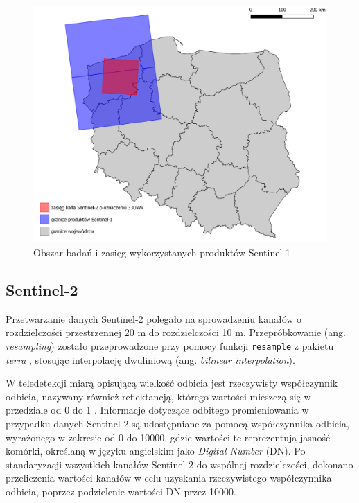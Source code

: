 \documentclass{amuthesis}
\begin{document}
\begin{figure}[t]

{\centering \includegraphics[width=1\textwidth,height=\textheight]{figures/sen1_extents.png}

}

\caption{\label{fig-rycina-s1-extents}Obszar badań i zasięg
wykorzystanych produktów Sentinel-1}

\end{figure}

\hypertarget{sec-processing-s2}{%
\subsection{Sentinel-2}\label{sec-processing-s2}}

Przetwarzanie danych Sentinel-2 polegało na sprowadzeniu kanałów o
rozdzielczości przestrzennej 20 m do rozdzielczości 10 m.
Przepróbkowanie (ang. \emph{resampling}) zostało przeprowadzone przy
pomocy funkcji \texttt{resample} z pakietu \emph{terra}
\autocite{R-terra}, stosując interpolację dwuliniową (ang.
\emph{bilinear interpolation}).

W teledetekcji miarą opisującą wielkość odbicia jest rzeczywisty
współczynnik odbicia, nazywany również reflektancją, którego wartości
mieszczą się w przedziale od 0 do 1 \autocite{hejmanowska_2020_dane}.
Informacje dotyczące odbitego promieniowania w przypadku danych
Sentinel-2 są udostępniane za pomocą współczynnika odbicia, wyrażonego w
zakresie od 0 do 10000, gdzie wartości te reprezentują jasność komórki,
określaną w języku angielskim jako \emph{Digital Number} (DN). Po
standaryzacji wszystkich kanałów Sentinel-2 do wspólnej rozdzielczości,
dokonano przeliczenia wartości kanałów w celu uzyskania rzeczywistego
współczynnika odbicia, poprzez podzielenie wartości DN przez 10000.
\end{document}
